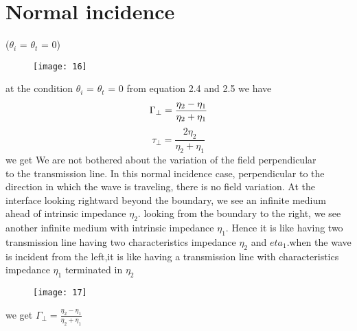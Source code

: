 \section{Normal incidence} ($\theta_{i}$ = $\theta_{t}$ = 0)
\begin{figure}[h]
	\centering
	\texttt{[image: 16]}
	\caption{}
\end{figure}
at the condition $\theta_{i}$ = $\theta_{t}$ = 0 from equation 2.4 and 2.5 we have\\
\begin{equation}
\centering
\Gamma_{\perp} = \frac{\eta_{2} - \eta_{1}}{\eta_{2} + \eta_{1}}
\end{equation}
\begin{equation}
\tau_{\perp} = \frac{2 \eta_{2}}{\eta_{2} + \eta_{1}}
\end{equation}
we get 
We are not bothered about the variation of the field perpendicular\\  to the transmission line. In this normal incidence case, perpendicular to the direction in which the wave is traveling, there is no field variation. At the interface looking rightward beyond the boundary, we see an infinite medium ahead of intrinsic impedance $\eta_{2}$. looking from the boundary to the right, we see another infinite medium with intrinsic impedance $\eta_{1}$. Hence it is like having two transmission line having two characteristics impedance  $\eta_{2}$ and  $eta_{1}$.when the wave is incident from the left,it is like having a transmission  line with characteristics impedance  $\eta_{1}$ terminated in  $\eta_{2}$\\
\begin{figure}[h]
	\centering
	\texttt{[image: 17]}
	\caption{}
\end{figure}
\begin{LARGE}
we get $\Gamma_{\perp} = \frac{\eta_{2} - \eta_{1}}{\eta_{2} + \eta_{1}}$\\
\end{LARGE}

